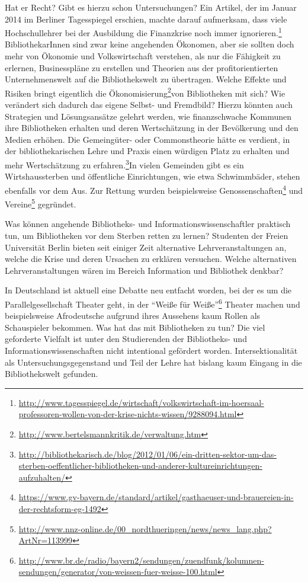 \documentclass[a4paper,
fontsize=11pt,
oneside,
numbers=noperiodatend,
parskip=half-,
bibliography=totoc,
final
]{scrartcl}
\begin{document}
Hat er Recht? Gibt es hierzu schon Untersuchungen? Ein Artikel, der im
Januar 2014 im Berliner Tagesspiegel erschien, machte darauf aufmerksam,
dass viele Hochschullehrer bei der Ausbildung die Finanzkrise noch immer
ignorieren.\footnote{\url{http://www.tagesspiegel.de/wirtschaft/volkswirtschaft-im-hoersaal-professoren-wollen-von-der-krise-nichts-wissen/9288094.html}}
BibliothekarInnen sind zwar keine angehenden Ökonomen, aber sie sollten
doch mehr von Ökonomie und Volkswirtschaft verstehen, als nur die
Fähigkeit zu erlernen, Businesspläne zu erstellen und Theorien aus der
profitorientierten Unternehmenswelt auf die Bibliothekswelt zu
übertragen. Welche Effekte und Risiken bringt eigentlich die
Ökonomisierung\footnote{\url{http://www.bertelsmannkritik.de/verwaltung.htm}}von
Bibliotheken mit sich? Wie verändert sich dadurch das eigene Selbst- und
Fremdbild? Hierzu könnten auch Strategien und Lösungsansätze gelehrt
werden, wie finanzschwache Kommunen ihre Bibliotheken erhalten und deren
Wertschätzung in der Bevölkerung und den Medien erhöhen. Die
Gemeingüter- oder Commonstheorie hätte es verdient, in der
bibliothekarischen Lehre und Praxis einen würdigen Platz zu erhalten und
mehr Wertschätzung zu erfahren.\footnote{\url{http://bibliothekarisch.de/blog/2012/01/06/ein-dritten-sektor-um-das-sterben-oeffentlicher-bibliotheken-und-anderer-kultureinrichtungen-aufzuhalten/}}In
vielen Gemeinden gibt es ein Wirtshaussterben und öffentliche
Einrichtungen, wie etwa Schwimmbäder, stehen ebenfalls vor dem Aus. Zur
Rettung wurden beispielsweise Genossenschaften\footnote{\url{https://www.gv-bayern.de/standard/artikel/gasthaeuser-und-brauereien-in-der-rechtsform-eg-1492}}
und Vereine\footnote{\url{http://www.nnz-online.de/00\_nordthueringen/news/news\_lang.php?ArtNr=113999}}
gegründet.

Was können angehende Bibliotheks- und Informationswissenschaftler
praktisch tun, um Bibliotheken vor dem Sterben retten zu lernen?
Studenten der Freien Universität Berlin bieten seit einiger Zeit
alternative Lehrveranstaltungen an, welche die Krise und deren Ursachen
zu erklären versuchen. Welche alternativen Lehrveranstaltungen wären im
Bereich Information und Bibliothek denkbar?

In Deutschland ist aktuell eine Debatte neu entfacht worden, bei der es
um die Parallelgesellschaft Theater geht, in der \enquote{Weiße für
Weiße}\footnote{\url{http://www.br.de/radio/bayern2/sendungen/zuendfunk/kolumnen-sendungen/generator/von-weissen-fuer-weisse-100.html}}
Theater machen und beispielsweise Afrodeutsche aufgrund ihres Aussehens
kaum Rollen als Schauspieler bekommen. Was hat das mit Bibliotheken zu
tun? Die viel geforderte Vielfalt ist unter den Studierenden der
Bibliotheks- und Informationswissenschaften nicht intentional gefördert
worden. Intersektionalität als Untersuchungsgegenstand und Teil der
Lehre hat bislang kaum Eingang in die Bibliothekswelt gefunden.
\end{document}
